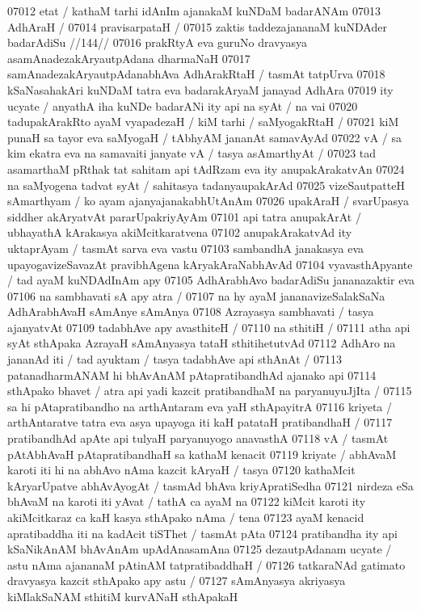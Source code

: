07012 etat / kathaM tarhi idAnIm ajanakaM kuNDaM badarANAm
07013 AdhAraH /
07014 	pravisarpataH /
07015 	zaktis taddezajananaM kuNDAder badarAdiSu //144//
07016 prakRtyA eva guruNo dravyasya asamAnadezakAryautpAdana dharmaNaH
07017 samAnadezakAryautpAdanabhAva AdhArakRtaH / tasmAt tatpUrva 
07018 kSaNasahakAri kuNDaM tatra eva badarakAryaM janayad AdhAra 
07019 ity ucyate / anyathA iha kuNDe badarANi ity api na syAt / na vai 
07020 tadupakArakRto ayaM vyapadezaH / kiM tarhi / saMyogakRtaH /  
07021 kiM punaH sa tayor eva saMyogaH / tAbhyAM jananAt samavAyAd 
07022 vA / sa kim ekatra eva na samavaiti janyate vA / tasya asAmarthyAt /  
07023 tad asamarthaM pRthak tat sahitam api tAdRzam eva ity anupakArakatvAn  
07024 na saMyogena tadvat syAt / sahitasya tadanyaupakArAd  
07025 vizeSautpatteH sAmarthyam / ko ayam ajanyajanakabhUtAnAm 
07026 upakAraH / svarUpasya siddher akAryatvAt pararUpakriyAyAm
07101 api tatra anupakArAt / ubhayathA kArakasya akiMcitkaratvena  
07102 anupakArakatvAd ity uktaprAyam / tasmAt sarva eva vastu 
07103 sambandhA janakasya eva upayogavizeSavazAt pravibhAgena kAryakAraNabhAvAd
07104 vyavasthApyante / tad ayaM kuNDAdInAm apy
07105 AdhArabhAvo badarAdiSu jananazaktir eva
07106 	na sambhavati sA apy atra / 
07107 na hy ayaM jananavizeSalakSaNa AdhArabhAvaH sAmAnye sAmAnya 
07108 Azrayasya sambhavati / tasya ajanyatvAt
07109 	tadabhAve apy avasthiteH /  
07110 	na sthitiH /  
07111 atha api syAt sthApaka AzrayaH sAmAnyasya tataH sthitihetutvAd  
07112 AdhAro na jananAd iti / tad ayuktam / tasya tadabhAve api  sthAnAt /
07113 patanadharmANAM hi bhAvAnAM pAtapratibandhAd ajanako api 
07114 sthApako bhavet / atra api yadi kazcit pratibandhaM na paryanuyuJjIta / 
07115 sa hi pAtapratibandho na arthAntaram eva yaH sthApayitrA
07116 kriyeta / arthAntaratve tatra eva asya upayoga iti kaH patataH pratibandhaH /
07117 pratibandhAd apAte api tulyaH paryanuyogo anavasthA  
07118 vA / tasmAt pAtAbhAvaH pAtapratibandhaH sa kathaM kenacit
07119 kriyate / abhAvaM karoti iti hi na abhAvo nAma kazcit kAryaH / tasya  
07120 kathaMcit kAryarUpatve abhAvAyogAt / tasmAd bhAva kriyApratiSedha
07121 nirdeza eSa bhAvaM na karoti iti yAvat / tathA ca ayaM na  
07122 kiMcit karoti ity akiMcitkaraz ca kaH kasya sthApako nAma / tena  
07123 ayaM kenacid apratibaddha iti na kadAcit tiSThet / tasmAt pAta  
07124 pratibandha ity api kSaNikAnAM bhAvAnAm upAdAnasamAna  
07125 dezautpAdanam ucyate / astu nAma ajananaM pAtinAM tatpratibaddhaH / 
07126 tatkaraNAd gatimato dravyasya kazcit sthApako apy astu /
07127 sAmAnyasya akriyasya kiMlakSaNAM sthitiM kurvANaH sthApakaH
